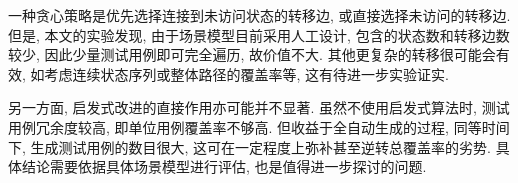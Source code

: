             一种贪心策略是优先选择连接到未访问状态的转移边, 或直接选择未访问的转移边. 但是, 本文的实验发现, 由于场景模型目前采用人工设计, 包含的状态数和转移边数较少, 因此少量测试用例即可完全遍历, 故价值不大. 其他更复杂的转移很可能会有效, 如考虑连续状态序列或整体路径的覆盖率等, 这有待进一步实验证实.
            
            另一方面, 启发式改进的直接作用亦可能并不显著. 虽然不使用启发式算法时, 测试用例冗余度较高, 即单位用例覆盖率不够高. 但收益于全自动生成的过程, 同等时间下, 生成测试用例的数目很大, 这可在一定程度上弥补甚至逆转总覆盖率的劣势. 具体结论需要依据具体场景模型进行评估, 也是值得进一步探讨的问题.
    

